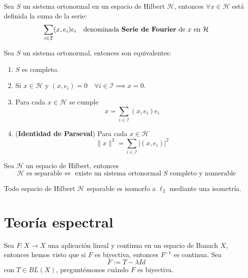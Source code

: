 \documentclass[12pt]{book}
\begin{document}
\begin{definicion}
    Sea $S$ un sistema ortonormal en un espacio de Hilbert $\mathcal{H}$, entonces $\forall x \in \mathcal{H}$ está definida la suma de la serie:
    \[ \sum_{i \in \mathcal{I}} (x, e_i) e_i \quad \text{denominada \textbf{Serie de Fourier} de } x \text{ en } \mathcal{H} \]

\end{definicion}

\begin{prop}
    Sea $S$ un sistema ortonormal, entonces son equivalentes:
    \begin{enumerate}
        \item $S$ es completo.
        \item Si $x \in \mathcal{H}$ y $(x, e_i) = 0 \quad \forall i \in \mathcal{I} \implies x = 0$.
        \item Para cada $x \in \mathcal{H}$ se cumple
        $$x = \sum_{i \in \mathcal{I}} (x, e_i) e_i$$
        \item (\textbf{Identidad de Parseval}) Para cada $x \in \mathcal{H}$
        $$\|x\|^2 = \sum_{i \in \mathcal{I}} |(x, e_i)|^2$$
    \end{enumerate}
\end{prop}

\begin{teo} 
    Sea $\mathcal{H}$ un espacio de Hilbert, entonces
    \begin{equation*}
        \mathcal{H} \text{ es separable} \iff \text{ existe un sistema ortonormal } S \text{ completo y numerable}
    \end{equation*}
\end{teo}

\begin{teo}
    Todo espacio de Hilbert $\mathcal{H}$ separable es isomorfo a $\ell_2$ mediante una isometría.
\end{teo}

\chapter{Teoría espectral}

\noindent 
Sea $F: X \to X$ una aplicación lineal y continua en un espacio de Banach $X$, entonces hemos visto que si $F$ es biyectiva, entonces $F^{-1}$ es continua. Sea 
$$F := T - \lambda Id$$
con $T \in BL(X)$, preguntémonos cuándo $F$ es biyectiva. \\
\end{document}
